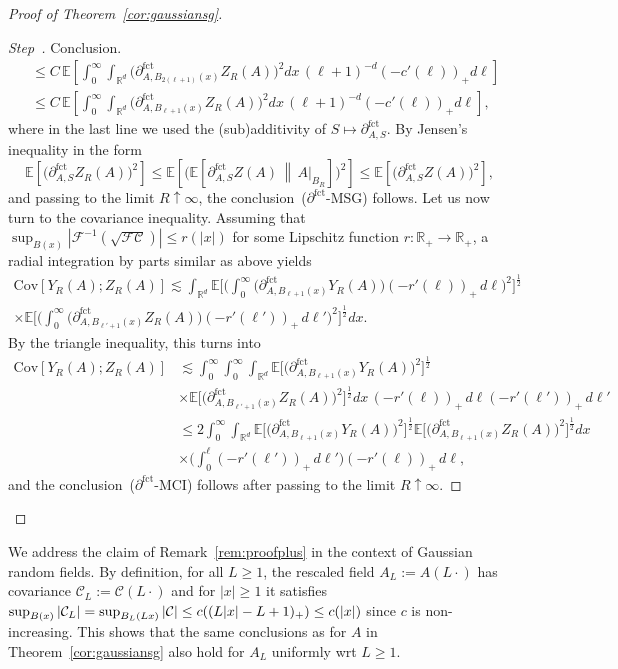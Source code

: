 \documentclass[AHL,Unicode,longabstracts]{cedram}
\newcommand{\R}{\mathbb R}
\newcommand{\E}{\mathbb{E}}
\newcommand{\expecM}[1]{\mathbb{E}\bigg[#1 \bigg]}
\newcommand{\expec}[1]{\mathbb{E}\left[#1 \right]}
\newcommand{\expeC}[2]{\mathbb{E}\left[\left. #1 \,\right\|\,#2\right]}
\newcommand{\Cc}{\mathcal C}
\newcommand{\F}{\mathcal F}
\newcommand{\parfct}[1]{\partial_{#1}^{\operatorname{fct}}}
\newcommand{\cov}[2]{\mathrm{Cov}\left[#1;#2\right]}
\newcounter{stepcount}
\newenvironment{step}{\refstepcounter{stepcount}\begin{proof}[Step~\thestepcount]}{\let\qed\relax\end{proof}}
\begin{document}
\begin{proof}[Proof of Theorem~\ref{cor:gaussiansg}]
\begin{step}{Conclusion.}
\begin{align*}
&\le C\,\E\left[\int_0^\infty \int_{\R^d}\Big(\parfct{A,B_{2(\ell+1)}(x)}Z_R(A)\Big)^2dx\,(\ell+1)^{-d}(-c'(\ell))_+d\ell\right]\\
&\le C\, \E\left[\int_0^\infty \int_{\R^d}\Big(\parfct{A,B_{\ell+1}(x)}Z_R(A)\Big)^2dx\,(\ell+1)^{-d}(-c'(\ell))_+d\ell\right],
\end{align*}
where in the last line we used the (sub)additivity of $S\mapsto\parfct{A,S}$. By Jensen's inequality in the form
\[
\expec{\Big(\parfct{A,S}Z_R(A)\Big)^2}\le\expec{\Big(\expeC{\parfct{A,S}Z(A)}{A|_{B_R}}\Big)^2}\le\expec{\Big(\parfct{A,S}Z(A)\Big)^2},
\]
and passing to the limit $R\uparrow\infty$, the conclusion~($\parfct{}$-MSG) follows. Let us now turn to the covariance inequality. Assuming that $\sup_{B(x)}|\F^{-1}(\sqrt{\F\Cc})|\le r(|x|)$ for some Lipschitz function $r:\R_+\to\R_+$, a radial integration by parts similar as above yields
\begin{multline*}
\cov {Y_R(A)}{Z_R(A)}\lesssim \int_{\R^d}\expecM{\bigg(\int_0^\infty \Big(\parfct{A,B_{\ell+1}(x)}Y_R(A)\Big)(-r'(\ell))_+\,d\ell\bigg)^2}^\frac12\\
\times\expecM{\bigg(\int_0^\infty \Big(\parfct{A,B_{\ell'+1}(x)}Z_R(A)\Big)(-r'(\ell'))_+\,d\ell'\bigg)^2}^\frac12 dx.
\end{multline*}
By the triangle inequality, this turns into
\begin{align*}
\cov {Y_R(A)}{Z_R(A)}&\lesssim \int_0^\infty\int_0^\infty\int_{\R^d}\expecM{\Big(\parfct{A,B_{\ell+1}(x)}Y_R(A)\Big)^2}^\frac12\\
&\times\expecM{\Big(\parfct{A,B_{\ell'+1}(x)}Z_R(A)\Big)^2}^\frac12 dx\,(-r'(\ell))_+\,d\ell(-r'(\ell'))_+\,d\ell'\\
&\le2\int_0^\infty\int_{\R^d}\expecM{\Big(\parfct{A,B_{\ell+1}(x)}Y_R(A)\Big)^2}^\frac12\expecM{\Big(\parfct{A,B_{\ell+1}(x)}Z_R(A)\Big)^2}^\frac12dx\\
&\times \Big(\int_0^\ell(-r'(\ell'))_+\,d\ell'\Big)(-r'(\ell))_+\,d\ell,
\end{align*}
and the conclusion~($\parfct{}$-MCI) follows after passing to the limit $R\uparrow\infty$.
\end{step}
\end{proof}

\begin{rema}\label{rem:rescale-2}
We address the claim of Remark~\ref{rem:proofplus} in the context of Gaussian random fields. By definition, for all $L\ge1$, the rescaled field $A_L:=A(L\cdot)$ has covariance $\Cc_L:=\Cc(L\cdot)$ and for $|x|\ge1$ it satisfies $\sup_{B(x)}|\Cc_L|=\sup_{B_L(Lx)}|\Cc|\linebreak\le c((L|x|-L+1)_+)\le c(|x|)$ since $c$ is non-increasing. This shows that the same conclusions as for $A$ in Theorem~\ref{cor:gaussiansg} also hold for $A_L$ uniformly wrt $L\ge1$.
\end{rema}








\end{document}
